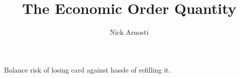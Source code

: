 \documentclass[11pt, oneside]{article}   	%
\title{The Economic Order Quantity}
\author{Nick Arnosti}
\begin{document}
\maketitle

Balance risk of losing card against hassle of refilling it.
\end{document}
